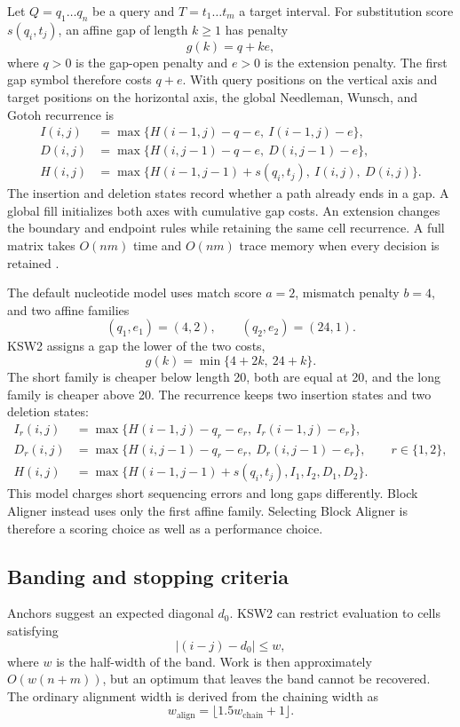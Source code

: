Let \(Q=q_1\ldots q_n\) be a query and \(T=t_1\ldots t_m\) a target interval.
For substitution score \(s(q_i,t_j)\), an affine gap of length \(k\geq 1\)
has penalty
\[
    g(k)=q+ke,
\]
where \(q>0\) is the gap-open penalty and \(e>0\) is the extension penalty.
The first gap symbol therefore costs \(q+e\). With query positions on the
vertical axis and target positions on the horizontal axis, the global
Needleman, Wunsch, and Gotoh recurrence is
\begin{align}
 I(i,j) &= \max\{H(i-1,j)-q-e,\ I(i-1,j)-e\},
 \label{eq:affine-i}\\
 D(i,j) &= \max\{H(i,j-1)-q-e,\ D(i,j-1)-e\},
 \label{eq:affine-d}\\
 H(i,j) &= \max\{H(i-1,j-1)+s(q_i,t_j),\ I(i,j),\ D(i,j)\}.
 \label{eq:affine-h}
\end{align}
The insertion and deletion states record whether a path already ends in a
gap. A global fill initializes both axes with cumulative gap costs. An
extension changes the boundary and endpoint rules while retaining the same
cell recurrence. A full matrix takes \(O(nm)\) time and \(O(nm)\) trace memory
when every decision is retained \cite{gotoh_1982_affine}.

The default nucleotide model uses match score \(a=2\), mismatch penalty
\(b=4\), and two affine families
\[
   (q_1,e_1)=(4,2), \qquad (q_2,e_2)=(24,1).
\]
KSW2 assigns a gap the lower of the two costs,
\[
    g(k)=\min\{4+2k,\ 24+k\}.
\]
The short family is cheaper below length 20, both are equal at 20, and the
long family is cheaper above 20. The recurrence keeps two insertion states
and two deletion states:
\begin{align}
 I_r(i,j)&=\max\{H(i-1,j)-q_r-e_r,\ I_r(i-1,j)-e_r\},\\
 D_r(i,j)&=\max\{H(i,j-1)-q_r-e_r,\ D_r(i,j-1)-e_r\},
 \qquad r\in\{1,2\},\\
 H(i,j)&=\max\{H(i-1,j-1)+s(q_i,t_j),
 I_1,I_2,D_1,D_2\}.
\end{align}
This model charges short sequencing errors and long gaps differently. Block
Aligner instead uses only the first affine family. Selecting Block Aligner is
therefore a scoring choice as well as a performance choice.

\subsection{Banding and stopping criteria}

Anchors suggest an expected diagonal \(d_0\). KSW2 can restrict evaluation to
cells satisfying
\[
        |(i-j)-d_0|\leq w,
\]
where \(w\) is the half-width of the band. Work is then approximately
\(O(w(n+m))\), but an optimum that leaves the band cannot be recovered. The
ordinary alignment width is derived from the chaining width as
\[
        w_{\mathrm{align}}=\lfloor 1.5w_{\mathrm{chain}}+1\rfloor.
\]


